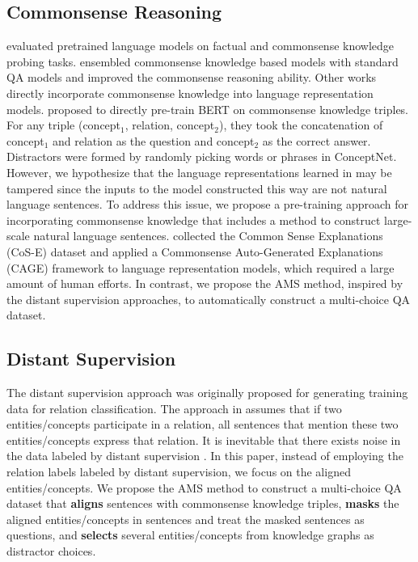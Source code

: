 \documentclass[11pt,a4paper]{article}
\begin{document}
\subsection{Commonsense Reasoning}
\citep{petroni2019language} evaluated pretrained language models on factual and commonsense knowledge probing tasks.
\citep{zhong2018improving} ensembled commonsense knowledge based models with standard QA models and improved the commonsense reasoning ability. 
Other works directly incorporate commonsense knowledge into language representation models. 
\citet{sun2019probing} proposed to directly pre-train BERT on commonsense knowledge triples.
For any triple (concept$_1$, relation, concept$_2$), they took the concatenation of concept$_1$ and relation as the question and concept$_2$ as the correct answer.
Distractors were formed by randomly picking words or phrases in ConceptNet. 
However, we hypothesize that the language representations learned in \citet{sun2019probing} may be tampered since the inputs to the model constructed this way are not natural language sentences. 
To address this issue, we propose a pre-training approach for incorporating commonsense knowledge that includes a method to construct large-scale natural language sentences.
\citet{rajani2019explain} collected the Common Sense Explanations (CoS-E) dataset and applied a Commonsense Auto-Generated Explanations (CAGE) framework to language representation models, which required a large amount of human efforts. 
In contrast, we propose the AMS method, inspired by the distant supervision approaches, to automatically construct a multi-choice QA dataset.

\subsection{Distant Supervision}
The distant supervision approach was originally proposed for generating training data for relation classification.
The approach in \citep{mintz-etal-2009-distant} assumes that if two entities/concepts participate in a relation, all sentences that mention these two entities/concepts express that relation.
It is inevitable that there exists noise in the data labeled by distant supervision \citep{riedel2010modeling}.
In this paper, instead of employing the relation labels labeled by distant supervision, we focus on the aligned entities/concepts. We propose the AMS method to construct a multi-choice QA dataset that \textbf{aligns} sentences with commonsense knowledge triples, \textbf{masks} the aligned entities/concepts in sentences and treat the masked sentences as questions,  and \textbf{selects} several entities/concepts from knowledge graphs as distractor choices.
\end{document}
